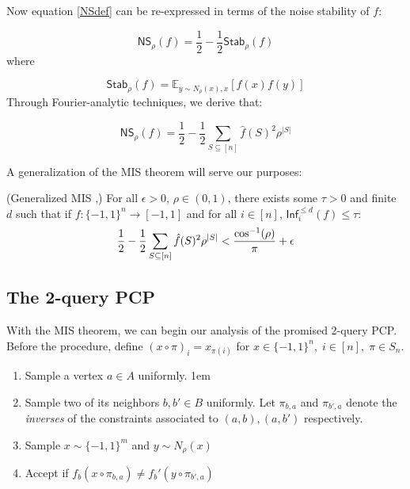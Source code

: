 Now equation \ref{NSdef} can be re-expressed in terms of the noise stability of $f$:

\begin{equation}
  \mathsf{NS}_\rho(f) = \frac{1}{2} - \frac{1}{2}\mathsf{Stab}_\rho(f)
\end{equation}
where

\begin{equation*}
  \mathsf{Stab}_\rho(f) = \mathbb{E}_{y \sim N_{\rho}(x), x}[f(x)f(y)]
\end{equation*}
Through Fourier-analytic techniques, we derive that:

\begin{equation}
  \mathsf{NS}_\rho(f) = \frac{1}{2} - \frac{1}{2}\sum_{S\subseteq [n]}\hat{f}(S)^2\rho^{|S|}
\end{equation}

A generalization of the MIS theorem will serve our purposes:

\begin{theorem} \label{generalMIS} (Generalized MIS \cite{khot2007optimal},\cite{mossel2005noise})
  For all $\epsilon > 0$, $\rho \in (0,1)$, there exists some $\tau > 0$ and finite $d$ such that if $f:\{-1,1\}^n \rightarrow [-1,1]$ and for all $i \in [n]$, $\mathsf{Inf}^{\leq d}_i(f) \leq \tau$:
  \begin{equation}
    \frac{1}{2} - \frac{1}{2}\sum_{S\subseteq [n]}\hat{f}(S)^2\rho^{|S|} < \frac{\cos^{-1}(\rho)}{\pi} + \epsilon
  \end{equation}
\end{theorem}

%
%
%
\subsection{The 2-query PCP}
With the MIS theorem, we can begin our analysis of the promised 2-query PCP. Before the procedure, define $(x \circ \pi)_i = x_{\pi(i)}$ for $x \in \{-1,1\}^n, \; i \in [n], \; \pi \in S_n$.  \newline

\begin{enumerate}
  \item Sample a vertex $a \in A$ uniformly.
  \itemsep1em
  \item Sample two of its neighbors $b,b' \in B$ uniformly. Let $\pi_{b,a}$ and $\pi_{b',a}$ denote the \emph{inverses} of the constraints associated to $(a,b), (a,b')$ respectively.
  \item Sample $x \sim \{-1,1\}^m$ and $y \sim N_\rho(x)$
  \item Accept if $f_b(x \circ \pi_{b,a}) \neq f_b'(y \circ \pi_{b',a})$
\end{enumerate}

